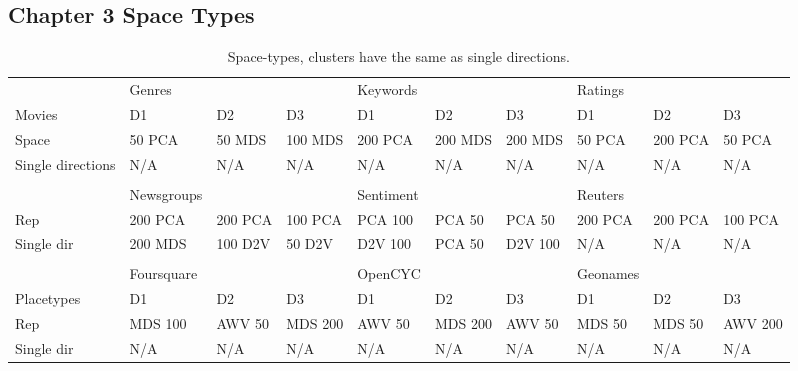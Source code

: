 \subsection{Chapter 3 Space Types}
\begin{landscape}
	\begin{table}[]
		\begin{tabular}{llllllllll}
			& Genres     &         &         & Keywords  &         &         & Ratings  &         &         \\
			Movies            & D1         & D2      & D3      & D1        & D2      & D3      & D1       & D2      & D3      \\
			Space             & 50 PCA     & 50 MDS  & 100 MDS & 200 PCA   & 200 MDS & 200 MDS & 50 PCA   & 200 PCA & 50 PCA  \\
			Single directions & N/A        & N/A     & N/A     & N/A       & N/A     & N/A     & N/A      & N/A     & N/A     \\
			&            &         &         &           &         &         &          &         &         \\
			& Newsgroups &         &         & Sentiment &         &         & Reuters  &         &         \\
			Rep               & 200 PCA    & 200 PCA & 100 PCA & PCA 100   & PCA 50  & PCA 50  & 200 PCA  & 200 PCA & 100 PCA \\
			Single dir        & 200 MDS    & 100 D2V & 50 D2V  & D2V 100   & PCA 50  & D2V 100 & N/A      & N/A     & N/A     \\
			&            &         &         &           &         &         &          &         &         \\
			& Foursquare &         &         & OpenCYC   &         &         & Geonames &         &         \\
			Placetypes        & D1         & D2      & D3      & D1        & D2      & D3      & D1       & D2      & D3      \\
			Rep               & MDS 100    & AWV 50  & MDS 200 & AWV 50    & MDS 200 & AWV 50  & MDS 50   & MDS 50  & AWV 200 \\
			Single dir        & N/A        & N/A     & N/A     & N/A       & N/A     & N/A     & N/A      & N/A     & N/A    
		\end{tabular}\caption{Space-types, clusters have the same as single directions.}
	\end{table}
\end{landscape}




